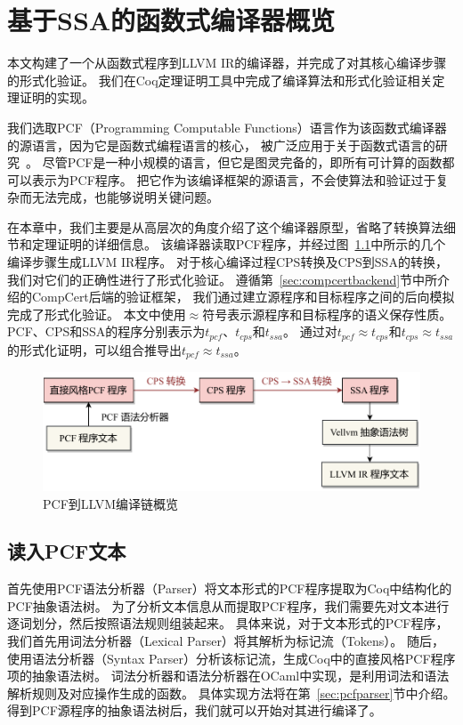 
\chapter{基于SSA的函数式编译器概览} \label{sec:overview}

本文构建了一个从函数式程序到LLVM IR的编译器，并完成了对其核心编译步骤的形式化验证。
我们在Coq定理证明工具中完成了编译算法和形式化验证相关定理证明的实现。

我们选取PCF（Programming Computable Functions）语言作为该函数式编译器的源语言，因为它是函数式编程语言的核心，
被广泛应用于关于函数式语言的研究~\cite{plotkin1977lcf,ABRAMSKY2000409}。
尽管PCF是一种小规模的语言，但它是图灵完备的，即所有可计算的函数都可以表示为PCF程序。
把它作为该编译框架的源语言，不会使算法和验证过于复杂而无法完成，也能够说明关键问题。

在本章中，我们主要是从高层次的角度介绍了这个编译器原型，省略了转换算法细节和定理证明的详细信息。
该编译器读取PCF程序，并经过图~\ref{overview}中所示的几个编译步骤生成LLVM IR程序。
对于核心编译过程CPS转换及CPS到SSA的转换，我们对它们的正确性进行了形式化验证。
遵循第~\ref{sec:compcertbackend}节中所介绍的CompCert后端的验证框架，
我们通过建立源程序和目标程序之间的后向模拟完成了形式化验证。
本文中使用$\approx $符号表示源程序和目标程序的语义保存性质。
PCF、CPS和SSA的程序分别表示为$t_{pcf}$、$t_{cps}$和$t_{ssa}$。
通过对$t_{pcf}\approx t_{cps}$和$t_{cps}\approx t_{ssa}$的形式化证明，可以组合推导出$t_{pcf}\approx t_{ssa}$。

\begin{figure}[htbp]
    \centering
    \vspace{2ex}
    \includegraphics[width=0.8\linewidth]{figures/overview.pdf}
    \caption{PCF到LLVM编译链概览}\label{overview}
\end{figure}

\section{读入PCF文本}

首先使用PCF语法分析器（Parser）将文本形式的PCF程序提取为Coq中结构化的PCF抽象语法树。
为了分析文本信息从而提取PCF程序，我们需要先对文本进行逐词划分，然后按照语法规则组装起来。
具体来说，对于文本形式的PCF程序，
我们首先用词法分析器（Lexical Parser）将其解析为标记流（Tokens）。
随后，使用语法分析器（Syntax Parser）分析该标记流，生成Coq中的直接风格PCF程序项的抽象语法树。
词法分析器和语法分析器在OCaml中实现，是利用词法和语法解析规则及对应操作生成的函数。
具体实现方法将在第~\ref{sec:pcfparser}节中介绍。
得到PCF源程序的抽象语法树后，我们就可以开始对其进行编译了。

